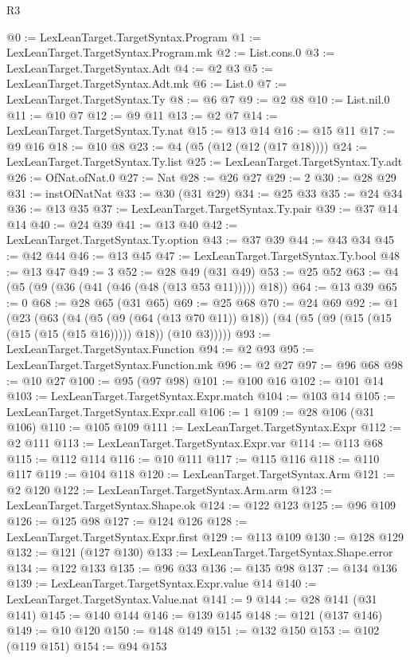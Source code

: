 \begin{lexlean}{R3}
\begin{coremodule}
{{{{{{{{{{{{{{{{{{{{{{{{{{{{{{{{{{{{{{{{{{{{{{{{{{{{{{{{{{{{{{{{{{{{{{{{{{{@0 := LexLeanTarget.TargetSyntax.Program
@1 := LexLeanTarget.TargetSyntax.Program.mk
@2 := List.cons.{0}
@3 := LexLeanTarget.TargetSyntax.Adt
@4 := @2 @3
@5 := LexLeanTarget.TargetSyntax.Adt.mk
@6 := List.{0}
@7 := LexLeanTarget.TargetSyntax.Ty
@8 := @6 @7
@9 := @2 @8
@10 := List.nil.{0}
@11 := @10 @7
@12 := @9 @11
@13 := @2 @7
@14 := LexLeanTarget.TargetSyntax.Ty.nat
@15 := @13 @14
@16 := @15 @11
@17 := @9 @16
@18 := @10 @8
@23 := @4 (@5 (@12 (@12 (@17 @18))))
@24 := LexLeanTarget.TargetSyntax.Ty.list
@25 := LexLeanTarget.TargetSyntax.Ty.adt
@26 := OfNat.ofNat.{0}
@27 := Nat
@28 := @26 @27
@29 := 2
@30 := @28 @29
@31 := instOfNatNat
@33 := @30 (@31 @29)
@34 := @25 @33
@35 := @24 @34
@36 := @13 @35
@37 := LexLeanTarget.TargetSyntax.Ty.pair
@39 := @37 @14 @14
@40 := @24 @39
@41 := @13 @40
@42 := LexLeanTarget.TargetSyntax.Ty.option
@43 := @37 @39
@44 := @43 @34
@45 := @42 @44
@46 := @13 @45
@47 := LexLeanTarget.TargetSyntax.Ty.bool
@48 := @13 @47
@49 := 3
@52 := @28 @49 (@31 @49)
@53 := @25 @52
@63 := @4 (@5 (@9 (@36 (@41 (@46 (@48 (@13 @53 @11))))) @18))
@64 := @13 @39
@65 := 0
@68 := @28 @65 (@31 @65)
@69 := @25 @68
@70 := @24 @69
@92 := @1
    (@23
      (@63
        (@4
          (@5 (@9 (@64 (@13 @70 @11)) @18))
          (@4 (@5 (@9 (@15 (@15 (@15 (@15 (@15 @16))))) @18)) (@10 @3)))))
@93 := LexLeanTarget.TargetSyntax.Function
@94 := @2 @93
@95 := LexLeanTarget.TargetSyntax.Function.mk
@96 := @2 @27
@97 := @96 @68
@98 := @10 @27
@100 := @95 (@97 @98)
@101 := @100 @16
@102 := @101 @14
@103 := LexLeanTarget.TargetSyntax.Expr.match
@104 := @103 @14
@105 := LexLeanTarget.TargetSyntax.Expr.call
@106 := 1
@109 := @28 @106 (@31 @106)
@110 := @105 @109
@111 := LexLeanTarget.TargetSyntax.Expr
@112 := @2 @111
@113 := LexLeanTarget.TargetSyntax.Expr.var
@114 := @113 @68
@115 := @112 @114
@116 := @10 @111
@117 := @115 @116
@118 := @110 @117
@119 := @104 @118
@120 := LexLeanTarget.TargetSyntax.Arm
@121 := @2 @120
@122 := LexLeanTarget.TargetSyntax.Arm.arm
@123 := LexLeanTarget.TargetSyntax.Shape.ok
@124 := @122 @123
@125 := @96 @109
@126 := @125 @98
@127 := @124 @126
@128 := LexLeanTarget.TargetSyntax.Expr.first
@129 := @113 @109
@130 := @128 @129
@132 := @121 (@127 @130)
@133 := LexLeanTarget.TargetSyntax.Shape.error
@134 := @122 @133
@135 := @96 @33
@136 := @135 @98
@137 := @134 @136
@139 := LexLeanTarget.TargetSyntax.Expr.value @14
@140 := LexLeanTarget.TargetSyntax.Value.nat
@141 := 9
@144 := @28 @141 (@31 @141)
@145 := @140 @144
@146 := @139 @145
@148 := @121 (@137 @146)
@149 := @10 @120
@150 := @148 @149
@151 := @132 @150
@153 := @102 (@119 @151)
@154 := @94 @153
}}}}}}}}}}}}}}}}}}}}}}}}}}}}}}}}}}}}}}}}}}}}}}}}}}}}}}}}}}}}}}}}}}}}}}}}}}}
\end{coremodule}
\end{lexlean}
